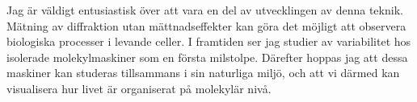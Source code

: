 \begin{otherlanguage}{swedish}
Jag är väldigt entusiastisk över att vara en del av utvecklingen av denna teknik. Mätning av diffraktion utan mättnadseffekter kan göra det möjligt att observera biologiska processer i levande celler. I framtiden ser jag studier av variabilitet hos isolerade molekylmaskiner som en första milstolpe. Därefter hoppas jag att dessa maskiner kan studeras tillsammans i sin naturliga miljö, och att vi därmed kan visualisera hur livet är organiserat på molekylär nivå.

\end{otherlanguage}
